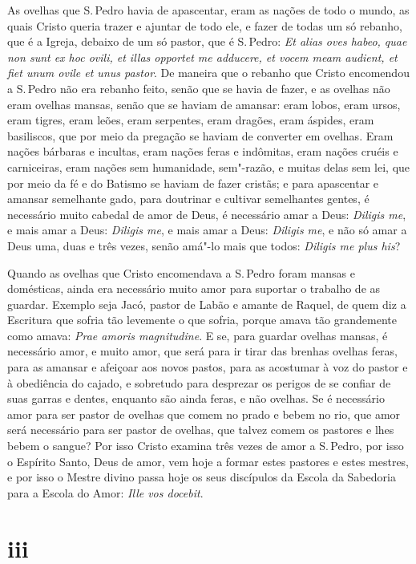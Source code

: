 As ovelhas que S.\,Pedro havia de apascentar, eram as nações de todo o
mundo, as quais Cristo queria trazer e ajuntar de todo ele, e fazer de
todas um só rebanho, que é a Igreja, debaixo de um só pastor, que é S.\,Pedro: \emph{Et alias oves habeo, quae non sunt ex hoc ovili, et illas
opportet me adducere, et vocem meam audient, et fiet unum ovile et unus
pastor}. De maneira que o rebanho que Cristo encomendou a S.\,Pedro não
era rebanho feito, senão que se havia de fazer, e as ovelhas não eram
ovelhas mansas, senão que se haviam de amansar: eram lobos, eram ursos,
eram tigres, eram leões, eram serpentes, eram dragões, eram áspides,
eram basiliscos, que por meio da pregação se haviam de converter em
ovelhas. Eram nações bárbaras e incultas, eram nações feras e indômitas,
eram nações cruéis e carniceiras, eram nações sem humanidade, sem"-razão,
e muitas delas sem lei, que por meio da fé e do Batismo se haviam de
fazer cristãs; e para apascentar e amansar semelhante gado, para
doutrinar e cultivar semelhantes gentes, é necessário muito cabedal de
amor de Deus, é necessário amar a Deus: \emph{Diligis me}, e mais amar a
Deus: \emph{Diligis me}, e mais amar a Deus: \emph{Diligis me}, e não só
amar a Deus uma, duas e três vezes, senão amá"-lo mais que todos:
\emph{Diligis me plus his}?

Quando as ovelhas que Cristo encomendava a S.\,Pedro foram mansas e
domésticas, ainda era necessário muito amor para suportar o trabalho de
as guardar. Exemplo seja Jacó, pastor de Labão e amante de Raquel, de
quem diz a Escritura que sofria tão levemente o que sofria, porque amava
tão grandemente como amava: \emph{Prae amoris magnitudine}. %
E se, para guardar ovelhas mansas, é necessário amor, e muito amor,
que será para ir tirar das brenhas ovelhas feras, para as amansar e
afeiçoar aos novos pastos, para as acostumar à voz do pastor e à
obediência do cajado, e sobretudo para desprezar os perigos de se
confiar de suas garras e dentes, enquanto são ainda feras, e não
ovelhas.
Se é necessário amor para ser pastor de ovelhas que comem no prado e
bebem no rio, que amor será necessário para ser pastor de ovelhas, que
talvez comem os pastores e lhes bebem o sangue? Por isso Cristo examina
três vezes de amor a S.\,Pedro, por isso o Espírito Santo, Deus de amor,
vem hoje a formar estes pastores e estes mestres, e por isso o Mestre
divino passa hoje os seus discípulos da Escola da Sabedoria para a
Escola do Amor: \emph{Ille vos docebit}.

\section*{iii}

